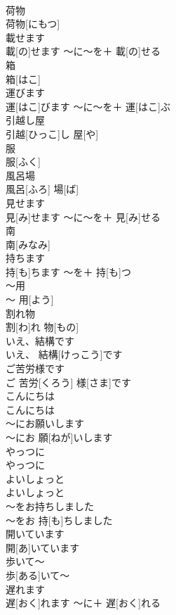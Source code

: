 \documentclass[8pt]{extreport}
\begin{document}
\begin{CJK}{UTF8}{min}
\\	荷物	
\\	荷物[にもつ]		
\\	載せます	
\\	載[の]せます	〜に〜を＋ 載[の]せる	
\\	箱	
\\	箱[はこ]		
\\	運びます	
\\	運[はこ]びます	〜に〜を＋ 運[はこ]ぶ	
\\	引越し屋	
\\	引越[ひっこ]し 屋[や]		
\\	服	
\\	服[ふく]		
\\	風呂場	
\\	風呂[ふろ] 場[ば]		
\\	見せます	
\\	見[み]せます	〜に〜を＋ 見[み]せる	
\\	南	
\\	南[みなみ]		
\\	持ちます	
\\	持[も]ちます	〜を＋ 持[も]つ	
\\	〜用	
\\	〜 用[よう]		
\\	割れ物	
\\	割[わ]れ 物[もの]		
\\	いえ、結構です	
\\	いえ、 結構[けっこう]です		
\\	ご苦労様です	
\\	ご 苦労[くろう] 様[さま]です		
\\	こんにちは	
\\	こんにちは		
\\	〜にお願いします	
\\	〜にお 願[ねが]いします		
\\	やっつに	
\\	やっつに		
\\	よいしょっと	
\\	よいしょっと		
\\	〜をお持ちしました	
\\	〜をお 持[も]ちしました		
\\	開いています	
\\	開[あ]いています		
\\	歩いて〜	
\\	歩[ある]いて〜		
\\	遅れます	
\\	遅[おく]れます	〜に＋ 遅[おく]れる	

\end{CJK}
\end{document}
